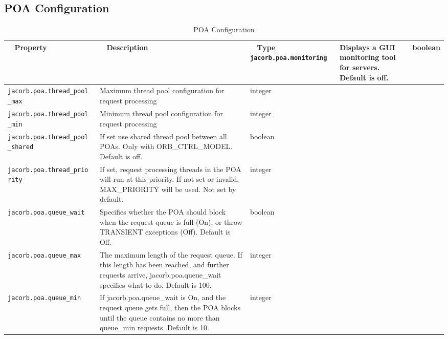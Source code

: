 \subsection{POA Configuration}
\begin{small}
\begin{longtable}{|p{5cm}|p{9cm}|p{2cm}|}
\caption{POA Configuration}\\
\hline
~ \hfill \textbf {Property} \hfill ~ & ~ \hfill \textbf {Description} \hfill ~ & ~ \hfill \textbf {Type} \hfill ~ \endhead
\hline
\verb"jacorb.poa.monitoring" & Displays a GUI monitoring tool for servers. Default is off. & boolean \\
\hline
\verb"jacorb.poa.thread_pool"
\verb"_max" & Maximum thread pool configuration for request processing & integer \\
\hline
\verb"jacorb.poa.thread_pool"
\verb"_min" & Minimum thread pool configuration for request processing & integer \\
\hline
\verb"jacorb.poa.thread_pool"
\verb"_shared" & If set use shared thread pool between all POAs. Only with
ORB\_CTRL\_MODEL. Default is off. & boolean \\
\hline
\verb"jacorb.poa.thread_prio"
\verb"rity" & If set, request processing threads in the POA will run at this priority. If not set or invalid, MAX\_PRIORITY will be used. Not set by default. & integer \\
\hline
\verb"jacorb.poa.queue_wait" & Specifies whether the POA should block
when the request queue is full (On), or throw TRANSIENT exceptions
(Off). Default is Off. & boolean\\
\hline
\verb"jacorb.poa.queue_max" & The maximum length of the request
queue.  If this length has been reached, and further requests arrive,
jacorb.poa.queue\_wait specifies what to do. Default is 100. & integer \\
\hline
\verb"jacorb.poa.queue_min" & If jacorb.poa.queue\_wait is On, and the
request queue gets full, then the POA blocks until the queue contains
no more than queue\_min requests. Default is 10. & integer \\
\hline
\end{longtable}
\end{small}


